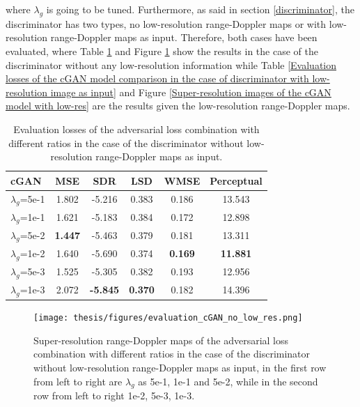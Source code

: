 where $\lambda_g$ is going to be tuned. Furthermore, as said in section \ref{discriminator}, the discriminator has two types, no low-resolution range-Doppler maps or with low-resolution range-Doppler maps as input. Therefore, both cases have been evaluated, where Table \ref{Evaluation losses of the cGAN model comparison in the case of discriminator without low-resolution image as input} and Figure \ref{Super-resolution images of the cGAN model no low-res} show the results in the case of the discriminator without any low-resolution information while Table \ref{Evaluation losses of the cGAN model comparison in the case of discriminator with low-resolution image as input} and Figure \ref{Super-resolution images of the cGAN model with low-res} are the results given the low-resolution range-Doppler maps.

\begin{table}
    \centering
    \caption{Evaluation losses of the adversarial loss combination with different ratios in the case of the discriminator without low-resolution range-Doppler maps as input.}
    \label{Evaluation losses of the cGAN model comparison in the case of discriminator without low-resolution image as input}
    \begin{tabular}{l|c|c|c|c|c}
        \hline
        cGAN & MSE & SDR & LSD & WMSE & Perceptual \\
        \hline
        $\lambda_g$=5e-1 & 1.802 & -5.216 & 0.383 & 0.186 & 13.543 \\
        \hline
        $\lambda_g$=1e-1 & 1.621 & -5.183 & 0.384 & 0.172 & 12.898 \\
        \hline
        $\lambda_g$=5e-2 & \textbf{1.447} & -5.463 & 0.379 & 0.181 & 13.311 \\
        \hline
        $\lambda_g$=1e-2 & 1.640 & -5.690 & 0.374 & \textbf{0.169} & \textbf{11.881} \\
        \hline
        $\lambda_g$=5e-3 & 1.525 & -5.305 & 0.382 & 0.193 & 12.956 \\
        \hline
        $\lambda_g$=1e-3 & 2.072 & \textbf{-5.845} & \textbf{0.370} & 0.182 & 14.396 \\
        \hline
    \end{tabular}
\end{table}

\begin{figure}
    \centering
    \texttt{[image: thesis/figures/evaluation\_cGAN\_no\_low\_res.png]}
    \caption{Super-resolution range-Doppler maps of the adversarial loss combination with different ratios in the case of the discriminator without low-resolution range-Doppler maps as input, in the first row from left to right are $\lambda_g$ as 5e-1, 1e-1 and 5e-2, while in the second row from left to right 1e-2, 5e-3, 1e-3.}
    \label{Super-resolution images of the cGAN model no low-res}
\end{figure}

